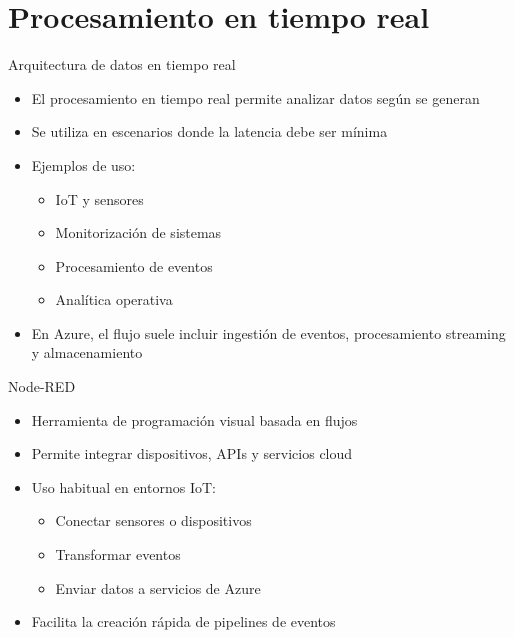 \documentclass{beamer}
\begin{document}
\section{Procesamiento en tiempo real}

\begin{frame}{Arquitectura de datos en tiempo real}
\begin{itemize}
    \item El procesamiento en tiempo real permite analizar datos según se generan
    \item Se utiliza en escenarios donde la latencia debe ser mínima
    \item Ejemplos de uso:
    \begin{itemize}
        \item IoT y sensores
        \item Monitorización de sistemas
        \item Procesamiento de eventos
        \item Analítica operativa
    \end{itemize}
    \item En Azure, el flujo suele incluir ingestión de eventos, procesamiento streaming y almacenamiento
\end{itemize}
\end{frame}

\begin{frame}{Node-RED}
\begin{itemize}
    \item Herramienta de programación visual basada en flujos
    \item Permite integrar dispositivos, APIs y servicios cloud
    \item Uso habitual en entornos IoT:
    \begin{itemize}
        \item Conectar sensores o dispositivos
        \item Transformar eventos
        \item Enviar datos a servicios de Azure
    \end{itemize}
    \item Facilita la creación rápida de pipelines de eventos
\end{itemize}
\end{frame}
\end{document}
